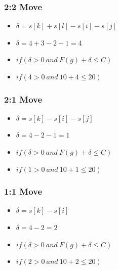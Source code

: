 \documentclass{beamer}
\begin{document}
\begin{frame}
\frametitle{2:2 Move}
\begin{footnotesize}
\begin{itemize}
\item $\delta = s[k]+s[l]-s[i]-s[j]$
\item $\delta = 4 + 3 - 2 - 1 = 4$
\item $if(\delta > 0 \ and \ F(g)+\delta \leq C)$
\item $if(4 > 0 \ and \ 10+4 \leq 20)$
\end{itemize}
\end{footnotesize}


\end{frame}
\begin{frame}
\frametitle{2:1 Move}
\begin{footnotesize}
\begin{itemize}
\item $\delta = s[k]-s[i]-s[j]$
\item $\delta = 4 - 2 - 1 = 1$
\item $if(\delta > 0 \ and \ F(g)+\delta \leq C)$
\item $if(1 > 0 \ and \ 10+1 \leq 20)$
\end{itemize}
\end{footnotesize}
\end{frame}
\begin{frame}
\frametitle{1:1 Move}
\begin{footnotesize}
\begin{itemize}
\item $\delta = s[k]-s[i]$
\item $\delta = 4 - 2 = 2$
\item $if(\delta > 0 \ and \ F(g)+\delta \leq C)$
\item $if(2 > 0 \ and \ 10+2 \leq 20)$
\end{itemize}
\end{footnotesize}
\end{frame}
\end{document}
